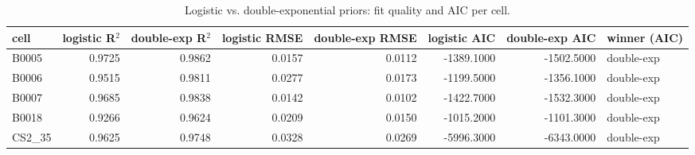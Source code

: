 \begin{table}
\caption{Logistic vs. double-exponential priors: fit quality and AIC per cell.}
\label{tab:prior_redundancy_aic}
\begin{tabular}{lrrrrrrl}
\toprule
cell & logistic R$^2$ & double-exp R$^2$ & logistic RMSE & double-exp RMSE & logistic AIC & double-exp AIC & winner (AIC) \\
\midrule
B0005 & 0.9725 & 0.9862 & 0.0157 & 0.0112 & -1389.1000 & -1502.5000 & double-exp \\
B0006 & 0.9515 & 0.9811 & 0.0277 & 0.0173 & -1199.5000 & -1356.1000 & double-exp \\
B0007 & 0.9685 & 0.9838 & 0.0142 & 0.0102 & -1422.7000 & -1532.3000 & double-exp \\
B0018 & 0.9266 & 0.9624 & 0.0209 & 0.0150 & -1015.2000 & -1101.3000 & double-exp \\
CS2\_35 & 0.9625 & 0.9748 & 0.0328 & 0.0269 & -5996.3000 & -6343.0000 & double-exp \\
\bottomrule
\end{tabular}
\end{table}
